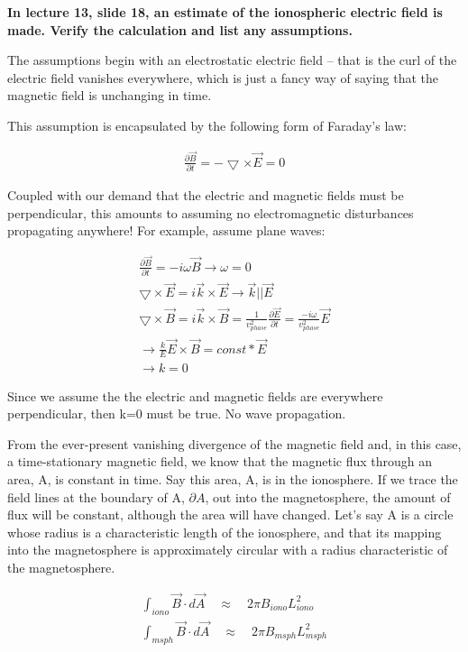 \textbf{In lecture 13, slide 18, an estimate of the ionospheric electric
field is made. Verify the calculation and list any assumptions.}

The assumptions begin with an electrostatic electric field -- that is
the curl of the electric field vanishes everywhere, which is just a
fancy way of saying that the magnetic field is unchanging in time.

This assumption is encapsulated by the following form of Faraday's law:

\begin{gather*}
  \frac{\partial \vec{B}}{\partial t} = -\bigtriangledown\times\vec{E} = 0
\end{gather*}

 Coupled with our demand that the electric and magnetic fields must be
 perpendicular, this amounts to assuming no electromagnetic
disturbances propagating anywhere! For example, assume plane waves:

\begin{gather*}
  \frac{\partial \vec{B}}{\partial t} = -i\omega\vec{B}
  \rightarrow \omega=0\\
  \bigtriangledown\times\vec{E} = i\vec{k}\times\vec{E}
  \rightarrow \vec{k} || \vec{E}\\
  \bigtriangledown\times\vec{B} = i\vec{k}\times\vec{B} =
  \frac{1}{v_{phase}^{2}} \frac{\partial \vec{E}}{\partial t} =
  \frac{-i\omega}{v_{phase}^{2}}\vec{E} \\
  \rightarrow \frac{k}{E}\vec{E}\times\vec{B} = const*\vec{E}\\
  \rightarrow k=0
\end{gather*}

Since we assume the the electric and magnetic fields are everywhere
perpendicular, then k=0 must be true. No wave propagation.

From the ever-present vanishing divergence of the magnetic field and, in
this case, a time-stationary magnetic field, we know that the magnetic
flux through an area, A, is constant in time. Say this area, A, is in
the ionosphere. If we trace the field lines at the boundary of A,
$\partial A$, out into the magnetosphere, the amount of flux will be
constant, although the area will have changed. Let's say A is a circle
whose radius is a characteristic length of the ionosphere, and that its
mapping into the magnetosphere is approximately circular with a radius
characteristic of the magnetosphere.

\begin{gather*}
  \int_{iono}{\vec{B}\cdot d\vec{A}} \quad\approx\quad 
  2\pi B_{iono}L_{iono}^{2}\\
  \int_{msph}{\vec{B}\cdot d\vec{A}} \quad\approx\quad 
  2\pi B_{msph}L_{msph}^{2}
\end{gather*}

